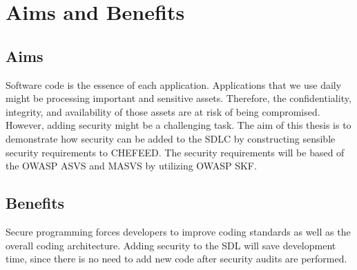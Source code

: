 \section{Aims and Benefits}

\subsection{Aims}
Software code is the essence of each application. Applications that we use daily might be processing important and sensitive assets. Therefore, the confidentiality, integrity, and availability of those assets are at risk of being compromised. However, adding security might be a challenging task. The aim of this thesis is to demonstrate how security can be added to the SDLC by constructing sensible security requirements to CHEFEED. The security requirements will be based of the OWASP ASVS and MASVS by utilizing OWASP SKF.

\subsection{Benefits}
Secure programming forces developers to improve coding standards as well as the overall coding architecture. Adding security to the SDL will save development time, since there is no need to add new code after security audits are performed.
